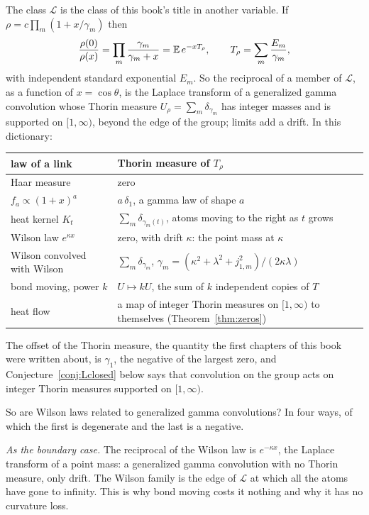 The class $\mathcal L$ is the class of this book's title in another variable. If $\rho=c\prod_m(1+x/\gamma_m)$ then
\[
\frac{\rho(0)}{\rho(x)}=\prod_m\frac{\gamma_m}{\gamma_m+x}=\mathbb{E}\,e^{-xT_\rho},\qquad T_\rho=\sum_m\frac{E_m}{\gamma_m},
\]
with independent standard exponential $E_m$. So the reciprocal of a member of $\mathcal L$, as a function of $x=\cos\theta$, is the Laplace transform of a generalized gamma convolution whose Thorin measure \cite{Th77,Bo92} $U_\rho=\sum_m\delta_{\gamma_m}$ has integer masses and is supported on $[1,\infty)$, beyond the edge of the group; limits add a drift. In this dictionary:
\begin{center}
\small
\begin{tabular}{p{}p{}}
\toprule
law of a link & Thorin measure of $T_\rho$ \\ \midrule
Haar measure & zero \\
$f_a\propto(1+x)^a$ & $a\,\delta_1$, a gamma law of shape $a$ \\
heat kernel $K_t$ & $\sum_m\delta_{\gamma_m(t)}$, atoms moving to the right as $t$ grows \\
Wilson law $e^{\kappa x}$ & zero, with drift $\kappa$: the point mass at $\kappa$ \\
Wilson convolved with Wilson & $\sum_m\delta_{\gamma_m}$, $\gamma_m=(\kappa^2+\lambda^2+j_{1,m}^2)/(2\kappa\lambda)$ \\
bond moving, power $k$ & $U\mapsto kU$, the sum of $k$ independent copies of $T$ \\
heat flow & a map of integer Thorin measures on $[1,\infty)$ to themselves (Theorem~\ref{thm:zeros}) \\
\bottomrule
\end{tabular}
\end{center}
The offset of the Thorin measure, the quantity the first chapters of this book were written about, is $\gamma_1$, the negative of the largest zero, and Conjecture~\ref{conj:Lclosed} below says that convolution on the group acts on integer Thorin measures supported on $[1,\infty)$.

So are Wilson laws related to generalized gamma convolutions? In four ways, of which the first is degenerate and the last is a negative.

\emph{As the boundary case.} The reciprocal of the Wilson law is $e^{-\kappa x}$, the Laplace transform of a point mass: a generalized gamma convolution with no Thorin measure, only drift. The Wilson family is the edge of $\mathcal L$ at which all the atoms have gone to infinity. This is why bond moving costs it nothing and why it has no curvature loss.

